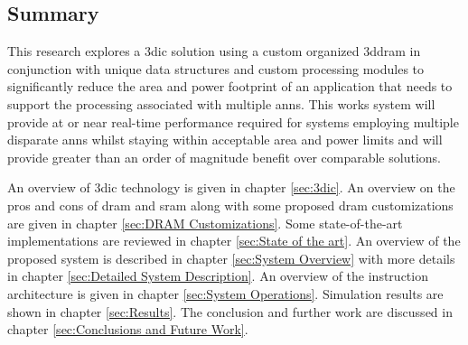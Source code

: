 \subsection[Summary]{Summary}
\label{sec:Summary}

This research explores a \ac{3dic} solution using a custom organized \ac{3ddram} in conjunction with unique data structures and custom processing modules to significantly reduce the 
area and power footprint of an application that needs to support the processing associated with multiple \ac{ann}s.
This works system will provide at or near real-time performance required for systems employing multiple disparate \ac{ann}s whilst staying within acceptable area and power limits and will provide greater than an order of magnitude benefit over comparable solutions.

An overview of \ac{3dic} technology is given in chapter \ref{sec:3dic}.
An overview on the pros and cons of \ac{dram} and \ac{sram} along with some proposed \ac{dram} customizations are given in chapter \ref{sec:DRAM Customizations}.
Some state-of-the-art implementations are reviewed in chapter \ref{sec:State of the art}.
An overview of the proposed system is described in chapter \ref{sec:System Overview} with more details in chapter \ref{sec:Detailed System Description}.
An overview of the instruction architecture is given in chapter \ref{sec:System Operations}.
Simulation results are shown in chapter \ref{sec:Results}.
The conclusion and further work are discussed in chapter \ref{sec:Conclusions and Future Work}.
